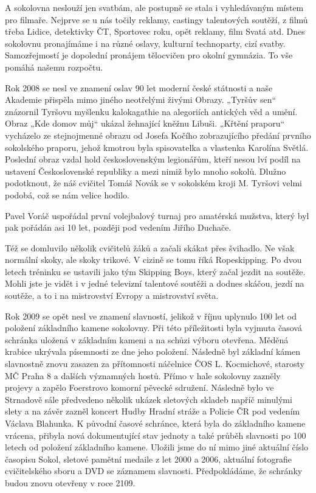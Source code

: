 A sokolovna neslouží jen svatbám, ale postupně se stala i vyhledávaným
místem pro filmaře. Nejprve se u nás točily reklamy, castingy
talentových soutěží, z filmů třeba Lidice, detektivky ČT, Sportovec
roku, opět reklamy, film Svatá atd. Dnes sokolovnu pronajímáme i na
různé oslavy, kulturní technoparty, cizí svatby. Samozřejmostí je
dopolední pronájem tělocvičen pro okolní gymnázia. To vše pomáhá našemu
rozpočtu.

Rok 2008 se nesl ve znamení oslav 90 let moderní české státnosti a naše
Akademie přispěla mimo jiného neotřelými živými Obrazy. „Tyršův sen``
znázornil Tyršovu myšlenku kalokagathie na alegoriích antických věd a
umění. Obraz „Kde domov můj`` ukázal žehnající kněžnu Libuši. „Křtění
praporu`` vycházelo ze stejnojmenné obrazu od Josefa Kočího
zobrazujícího předání prvního sokolského praporu, jehož kmotrou byla
spisovatelka a vlastenka Karolína Světlá. Poslední obraz vzdal hold
československým legionářům, kteří nesou lví podíl na ustavení
Československé republiky a mezi nimiž bylo mnoho sokolů. Dlužno
podotknout, že náš cvičitel Tomáš Novák se v sokolském kroji M. Tyršovi
velmi podobá, což se nám velice hodilo.

Pavel Voráč uspořádal první volejbalový turnaj pro amatérská mužstva,
který byl pak pořádán asi 10 let, později pod vedením Jiřího Duchače.

Též se domluvilo několik cvičitelů žáků a začali skákat přes švihadlo.
Ne však normální skoky, ale skoky trikové. V cizině se tomu říká
Ropeskipping. Po dvou letech tréninku se ustavili jako tým Skipping
Boys, který začal jezdit na soutěže. Mohli jste je vidět i v jedné
televizní talentové soutěži a dodnes skáčou, jezdí na soutěže, a to i na
mistrovství Evropy a mistrovství světa.

Rok 2009 se opět nesl ve znamení slavností, jelikož v říjnu uplynulo 100
let od položení základního kamene sokolovny. Při této příležitosti byla
vyjmuta časová schránka uložená v základním kameni a na schůzi výboru
otevřena. Měděná krabice ukrývala písemnosti ze dne jeho položení.
Následně byl základní kámen slavnostně znovu zasazen za přítomnosti
náčelnice ČOS L. Kocmichové, starosty MČ Praha 8 a dalších významných
hostů. Přímo v hale sokolovny zazněly projevy a zapělo Foerstrovo
komorní pěvecké sdružení. Následně bylo ve Strnadově sále předvedeno
několik ukázek sletových skladeb napříč minulými slety a na závěr zazněl
koncert Hudby Hradní stráže a Policie ČR pod vedením Václava Blahunka. K
původní časové schránce, která byla do základního kamene vrácena,
přibyla nová dokumentující stav jednoty a také průběh slavnosti po 100
letech od položení základního kamene. Uložili jsme do ní mimo jiné
aktuální číslo časopisu Sokol, sletové pamětní medaile z let 2000 a
2006, aktuální fotografie cvičitelského sboru a DVD se záznamem
slavnosti. Předpokládáme, že schránky budou znovu otevřeny v roce 2109.

